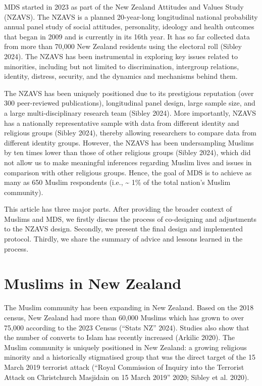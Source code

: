 \documentclass[
]{interact}
\begin{document}
MDS started in 2023 as part of the New Zealand Attitudes and Values
Study (NZAVS). The NZAVS is a planned 20-year-long longitudinal national
probability annual panel study of social attitudes, personality,
ideology and health outcomes that began in 2009 and is currently in its
16th year. It has so far collected data from more than 70,000 New
Zealand residents using the electoral roll (Sibley 2024). The NZAVS has
been instrumental in exploring key issues related to minorities,
including but not limited to discrimination, intergroup relations,
identity, distress, security, and the dynamics and mechanisms behind
them.

The NZAVS has been uniquely positioned due to its prestigious reputation
(over 300 peer-reviewed publications), longitudinal panel design, large
sample size, and a large multi-disciplinary research team (Sibley 2024).
More importantly, NZAVS has a nationally representative sample with data
from different identity and religious groups (Sibley 2024), thereby
allowing researchers to compare data from different identity groups.
However, the NZAVS has been undersampling Muslims by ten times lower
than those of other religious groups (Sibley 2024), which did not allow
us to make meaningful inferences regarding Muslim lives and issues in
comparison with other religious groups. Hence, the goal of MDS is to
achieve as many as 650 Muslim respondents (i.e., \textasciitilde{} 1\%
of the total nation's Muslim community).

This article has three major parts. After providing the broader context
of Muslims and MDS, we firstly discuss the process of co-designing and
adjustments to the NZAVS design. Secondly, we present the final design
and implemented protocol. Thirdly, we share the summary of advice and
lessons learned in the process.

\section{Muslims in New Zealand}\label{muslims-in-new-zealand}

The Muslim community has been expanding in New Zealand. Based on the
2018 census, New Zealand had more than 60,000 Muslims which has grown to
over 75,000 according to the 2023 Census ({``Stats NZ''} 2024). Studies
also show that the number of converts to Islam has recently increased
(Arkilic 2020). The Muslim community is uniquely positioned in New
Zealand: a growing religious minority and a historically stigmatised
group that was the direct target of the 15 March 2019 terrorist attack
({``Royal {C}ommission of {I}nquiry into the Terrorist Attack on
{C}hristchurch {M}asjidain on 15 {M}arch 2019''} 2020; Sibley et al.
2020).
\end{document}
